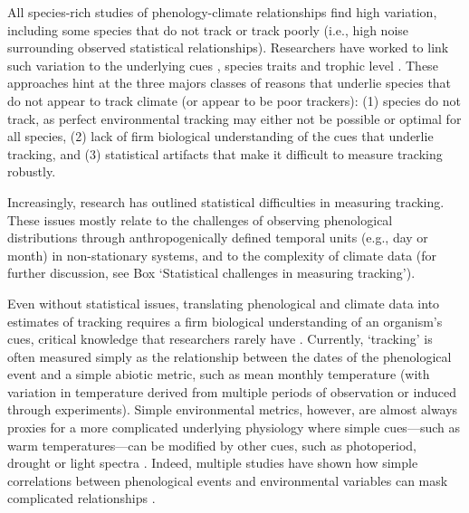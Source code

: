 \documentclass[11pt,letterpaper]{article}
\newcommand{\R}[1]{\label{#1}\linelabel{#1}}
\begin{document}
All species-rich studies of phenology-climate relationships find high variation, including some species that do not track or track poorly (i.e., high noise surrounding observed statistical relationships). Researchers have worked to link such variation to the underlying cues \citep[e.g.,][]{Cook:2012pnas}, species traits \citep[e.g.,][]{cohen2018} and trophic level \citep[e.g.,][]{thackeray2016}. These approaches hint at the three majors classes of reasons that underlie species that do not appear to track climate (or appear to be poor trackers): (1) species do not track, as perfect environmental tracking may either not be possible or optimal for all species, (2) lack of firm biological understanding of the cues that underlie tracking, and (3) statistical artifacts that make it difficult to measure tracking robustly. 

Increasingly, research has outlined statistical difficulties in measuring tracking. These issues mostly relate to the challenges of observing phenological distributions \citep{steer2019,carter2018}\R{addistribrefs} through anthropogenically defined temporal units (e.g., day or month) in non-stationary systems, and to the complexity of climate data (for further discussion, see Box `Statistical challenges in measuring tracking'). 

Even without statistical issues, translating phenological and climate data into estimates of tracking requires a firm biological understanding of an organism's cues, critical knowledge that researchers rarely have \citep{chmura2019}. Currently, `tracking' is often measured simply as the relationship between the dates of the phenological event and a simple abiotic metric, such as mean monthly temperature (with variation in temperature derived from multiple periods of observation or induced through experiments). Simple environmental metrics, however, are almost always proxies for a more complicated underlying physiology where simple cues---such as warm temperatures---can be modified by other cues, such as photoperiod, drought or light spectra \citep{Bagnall1993,Stinchcombe:2004ec}. Indeed, multiple studies have shown how simple correlations between phenological events and environmental variables can mask complicated relationships \citep{Cook:2012pnas,tansey2017}. %
\end{document}

